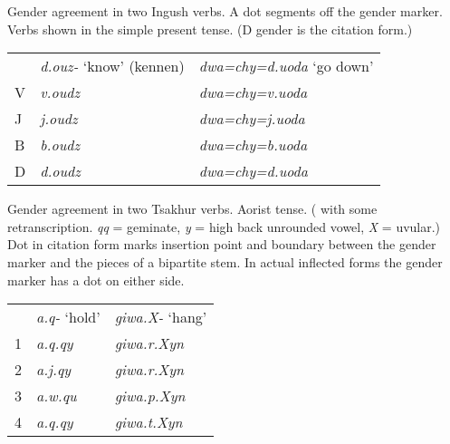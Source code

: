 \documentclass[output=collectionpaper]{langsci/langscibook}
\begin{document}
\ea
\label{ex:Nich:7}
Gender agreement in two Ingush verbs. A dot segments off the gender marker. Verbs shown in the simple present tense. (D gender is the citation form.)\\
\medskip
\begin{tabular}{p{0.5cm}p{4cm}p{5cm}}
	 &	{\itshape d.ouz-} `know' (kennen) &	{\itshape dwa=chy=d.uoda} `go down' \\
	V &	\itshape v.oudz &				\itshape dwa=chy=v.uoda \\
	J &	\itshape  j.oudz &				\itshape dwa=chy=j.uoda \\
	B &	\itshape b.oudz &				\itshape dwa=chy=b.uoda \\
	D &	\itshape d.oudz &				\itshape dwa=chy=d.uoda \\
\end{tabular}
\z

\ea
\label{ex:Nich:8}
Gender agreement in two Tsakhur verbs. Aorist tense. (\citealt[85]{Dobrushina1999} with some retranscription. \textit{qq} = geminate, \textit{y} = high back unrounded vowel, \textit{X} = uvular.) Dot in citation form marks insertion point and boundary between the gender marker and the pieces of a bipartite stem. In actual inflected forms the gender marker has a dot on either side. \\
\medskip
\begin{tabular}{p{0.5cm}p{4cm}p{5cm}}
	 &	{\itshape a.q-} `hold'	 &	{\itshape giwa.X-} `hang' \\
	1 &	\itshape a.q.qy &			\itshape 	giwa.r.Xyn \\
	2 &	\itshape  a.j.qy &			\itshape 	giwa.r.Xyn \\
	3 &	\itshape a.w.qu &			\itshape 	giwa.p.Xyn \\
	4 &	\itshape a.q.qy	 &			\itshape 	giwa.t.Xyn \\
\end{tabular}
\z
\end{document}
